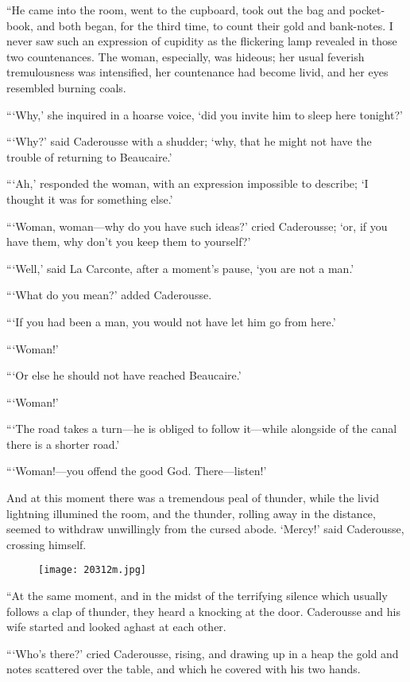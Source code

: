 “He came into the room, went to the cupboard, took out the bag and
pocket-book, and both began, for the third time, to count their gold
and bank-notes. I never saw such an expression of cupidity as the
flickering lamp revealed in those two countenances. The woman,
especially, was hideous; her usual feverish tremulousness was
intensified, her countenance had become livid, and her eyes resembled
burning coals.

“‘Why,’ she inquired in a hoarse voice, ‘did you invite him to sleep
here tonight?’

“‘Why?’ said Caderousse with a shudder; ‘why, that he might not have
the trouble of returning to Beaucaire.’

“‘Ah,’ responded the woman, with an expression impossible to describe;
‘I thought it was for something else.’

“‘Woman, woman—why do you have such ideas?’ cried Caderousse; ‘or, if
you have them, why don’t you keep them to yourself?’

“‘Well,’ said La Carconte, after a moment’s pause, ‘you are not a man.’

“‘What do you mean?’ added Caderousse.

“‘If you had been a man, you would not have let him go from here.’

“‘Woman!’

“‘Or else he should not have reached Beaucaire.’

“‘Woman!’

“‘The road takes a turn—he is obliged to follow it—while alongside of
the canal there is a shorter road.’

“‘Woman!—you offend the good God. There—listen!’

And at this moment there was a tremendous peal of thunder, while the
livid lightning illumined the room, and the thunder, rolling away in
the distance, seemed to withdraw unwillingly from the cursed abode.
‘Mercy!’ said Caderousse, crossing himself.

\begin{figure}[ht]
\texttt{[image: 20312m.jpg]}
\end{figure}

“At the same moment, and in the midst of the terrifying silence which
usually follows a clap of thunder, they heard a knocking at the door.
Caderousse and his wife started and looked aghast at each other.

“‘Who’s there?’ cried Caderousse, rising, and drawing up in a heap the
gold and notes scattered over the table, and which he covered with his
two hands.

